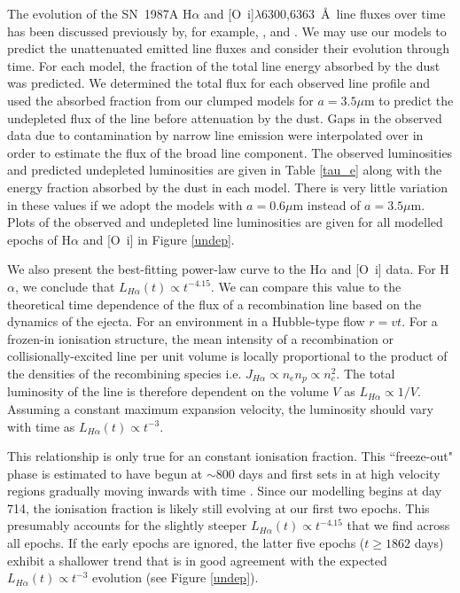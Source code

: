 \documentclass[useAMS,usenatbib,usegraphicx]{mnras}
\begin{document}
The evolution of the SN~1987A H$\alpha$ and [O~{\sc i}]$\lambda$6300,6363~\AA\ line fluxes over time has been discussed previously by, for example, \citet{Li1992}, \citet{Xu1992} and \citet{Kozma1998}.  We may use our models to predict the unattenuated emitted line fluxes and consider their evolution through time.  For each model, the fraction of the total line energy absorbed by the dust was predicted.  We determined the total flux for each observed line profile and used the absorbed fraction from our clumped models for $a=3.5\mu$m to predict the undepleted flux of the line before attenuation by the dust.  Gaps in the observed data due to contamination by narrow line emission were interpolated over in order to estimate the flux of the broad line component.  The observed luminosities and predicted undepleted luminosities are given in Table \ref{tau_e} along with the energy fraction absorbed by the dust in each model.  There is very little variation in these values if we adopt the models with $a=0.6\mu$m instead of $a=3.5\mu$m.  Plots of the observed and undepleted line luminosities are given for all modelled epochs of H$\alpha$ and [O~{\sc i}] in Figure \ref{undep}.

We also present the best-fitting power-law curve to the H$\alpha$ and [O~{\sc i}] data.  For H$\alpha$, we conclude that $L_{H\alpha}(t) \propto t^{-4.15}$.  We can compare this value to the theoretical time dependence of the flux of a recombination line based on the dynamics of the ejecta.  For an environment in a Hubble-type flow $r=vt$.  For a frozen-in ionisation structure, the mean intensity of a recombination or collisionally-excited line per unit volume is locally proportional to the product of the densities of the recombining species i.e. $J_{H\alpha} \propto n_e n_p \propto n_e^2$.  The total luminosity of the line is therefore dependent on the volume $V$ as $L_{H\alpha} \propto 1/V $.  Assuming a constant maximum expansion velocity, the luminosity should vary with time as  $L_{H\alpha}(t) \propto  t^{-3}$.  

This relationship is only true for an  constant ionisation fraction.  This ``freeze-out" phase is estimated to have begun at $\sim 800$ days and first sets in at high velocity regions gradually moving inwards with time \citep{Danziger1991,Fransson1993}.  Since our modelling begins at day 714, the ionisation fraction is likely still evolving at our first two epochs.  This presumably accounts for the slightly steeper $L_{H\alpha}(t) \propto t^{-4.15}$ that we find across all epochs.  If the early epochs are ignored, the latter five epochs ($t \ge 1862$ days) exhibit a shallower trend that is in good agreement with the expected $L_{H\alpha}(t) \propto t^{-3}$ evolution (see Figure \ref{undep}).
\end{document}
